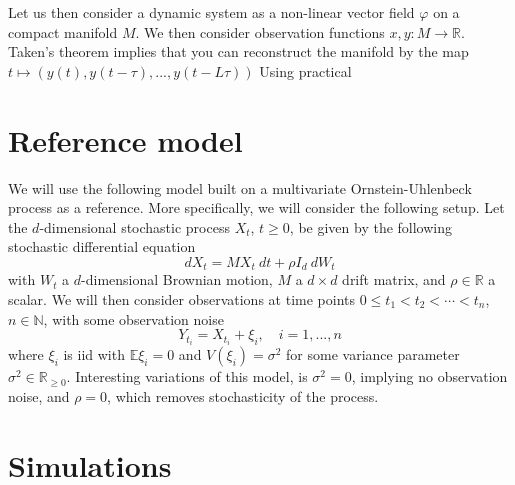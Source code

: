\documentclass[11pt, a4paper]{memoir}
\begin{document}
Let us then consider a dynamic system as a non-linear vector field $\varphi$ on a compact manifold $M$. We then consider observation functions $x,y: M\to \mathbb{R}$. Taken's theorem implies that you can reconstruct the manifold by the map
$t\mapsto (y(t),y(t-\tau),...,y(t-L\tau))$
Using practical  
\section{Reference model}
We will use the following model built on a multivariate Ornstein-Uhlenbeck process as a reference. More specifically, we will consider the following setup. Let the $d$-dimensional stochastic process $X_t$, $t\geq 0$, be given by the following stochastic differential equation
$$dX_t=M X_t\ dt+\rho I_d\ dW_t$$
with $W_t$ a $d$-dimensional  Brownian motion, $M$ a $d\times d$ drift matrix, and $\rho\in \mathbb{R}$ a scalar. We will then consider observations at time points $0\leq t_1<t_2<\cdots <t_n$, $n\in \mathbb{N}$, with some observation noise
$$Y_{t_i}=X_{t_i}+\xi_i,\quad i=1,...,n$$
where $\xi_i$ is iid with $\mathbb{E} \xi_i=0$ and $V(\xi_i)=\sigma^2$ for some variance parameter $\sigma^2\in \mathbb{R}_{\geq 0}$. Interesting variations of this model, is $\sigma^2=0$, implying no observation noise, and $\rho=0$, which removes stochasticity of the process.


\section{Simulations}
 
 
\normalem


\end{document}
